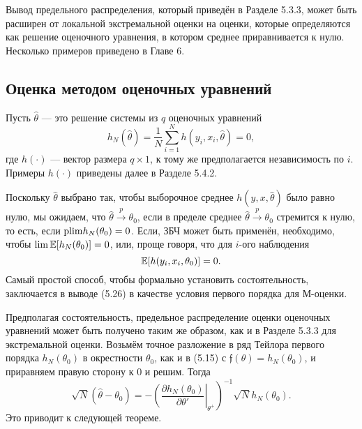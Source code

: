 Вывод предельного распределения, который приведён в Разделе 5.3.3, может быть расширен от локальной экстремальной оценки на оценки, которые определяются как решение оценочного уравнения, в котором среднее приравнивается к нулю. Несколько примеров приведено в Главе 6.

\subsection{Оценка методом оценочных уравнений}

Пусть $\hat{\theta}$ --- это решение системы из $q$ оценочных уравнений
\begin{equation}
h_N(\hat{\theta})=\frac{1}{N} \sum_{i=1}^{N} h(y_i,x_i,\hat{\theta})=0,
\end{equation}
где $h(\cdot)$ --- вектор размера $q \times 1$, к тому же предполагается независимость по $i$. Примеры $h(\cdot)$ приведены далее в Разделе 5.4.2.

Поскольку $\hat{\theta}$ выбрано так, чтобы выборочное среднее $h(y,x,\hat{\theta})$ было равно нулю, мы ожидаем, что $\hat{\theta} \xrightarrow{p} \theta_0$, если в пределе среднее $\hat{\theta} \xrightarrow{p} \theta_0$ стремится к нулю, то есть, если $\mathrm{plim } h_N(\theta_0)=0$. Если, ЗБЧ может быть применён, необходимо, чтобы $\lim \mathbb{E}[h_N(\theta_0)]=0$, или, проще говоря, что для $i$-ого наблюдения
\begin{equation}
\mathbb{E}[h(y_i,x_i,\theta_0)]=0.
\end{equation}
Самый простой способ, чтобы формально установить состоятельность, заключается в выводе (5.26) в качестве условия первого порядка для М-оценки.

Предполагая состоятельность, предельное распределение оценки оценочных уравнений может быть получено таким же образом, как и в Разделе 5.3.3 для экстремальной оценки. Возьмём точное разложение в ряд Тейлора первого порядка $h_N(\theta_0)$ в окрестности $\theta_0$, как и в (5.15) с $\mathfrak{f}(\theta)=h_N(\theta_0)$, и приравняем правую сторону к 0 и решим. Тогда
\begin{equation}
\left. \sqrt{N}(\hat{\theta}-\theta_0)=- \left( \frac{\partial h_N(\theta_0)}{\partial \theta'} \right|_{\theta^{+}} \right) ^{-1} \sqrt{N} h_N(\theta_0).
\end{equation}
Это приводит к следующей теореме.

